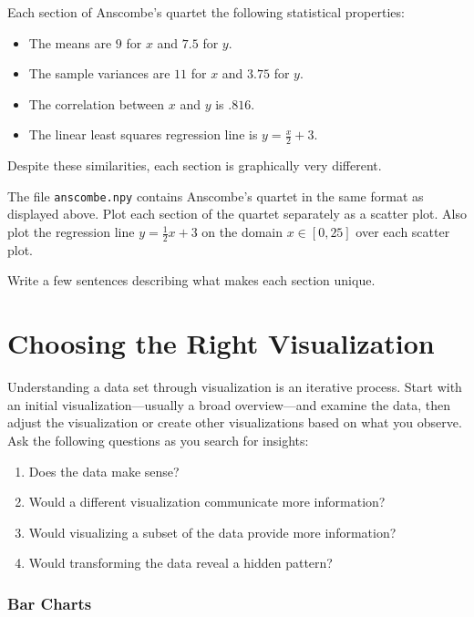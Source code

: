 Each section of Anscombe's quartet the following statistical properties:
\begin{itemize}
\item The means are $9$ for $x$ and $7.5$ for $y$.
\item The sample variances are $11$ for $x$ and $3.75$ for $y$.
\item The correlation between $x$ and $y$ is $.816$.
\item The linear least squares regression line is $y=\frac{x}{2}+3$.
\end{itemize}

Despite these similarities, each section is graphically very different.

\begin{problem} %
\label{prob:anscombe}
The file \texttt{anscombe.npy} contains Anscombe's quartet in the same format as displayed above.
Plot each section of the quartet separately as a scatter plot.
Also plot the regression line $y = \frac{1}{2}x + 3$ on the domain $x\in[0,25]$ over each scatter plot.

Write a few sentences describing what makes each section unique.
\end{problem}

\section*{Choosing the Right Visualization} %

Understanding a data set through visualization is an iterative process.
Start with an initial visualization---usually a broad overview---and examine the data, then adjust the visualization or create other visualizations based on what you observe.
Ask the following questions as you search for insights:
\begin{enumerate}
\item Does the data make sense?
\item Would a different visualization communicate more information?
\item Would visualizing a subset of the data provide more information?
\item Would transforming the data reveal a hidden pattern?
\end{enumerate}

\subsubsection*{Bar Charts} %

